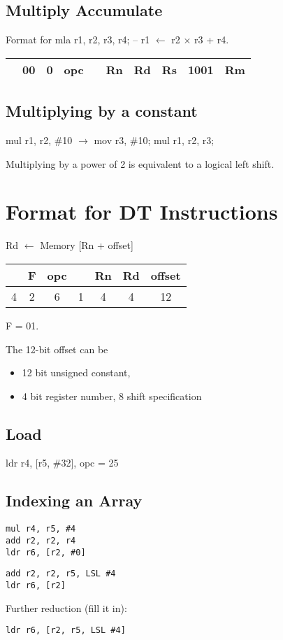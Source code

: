 \documentclass{scrartcl}
\begin{document}
\subsection{Multiply Accumulate}
Format for mla r1, r2, r3, r4; -- r1 $\leftarrow$ r2 $\times$ r3 + r4.

\begin{tabular}{|c|c|c|c|c|c|c|c|c|c|}
	\hline
	& 00 & 0 & opc & & Rn & Rd & Rs & 1001 & Rm\\
	\hline
\end{tabular}

\subsection{Multiplying by a constant}
mul r1, r2, \#10 $\to$ mov r3, \#10; mul r1, r2, r3;

Multiplying by a power of 2 is equivalent to a logical left shift.

\section{Format for DT Instructions}
Rd $\leftarrow$ Memory [Rn + offset]

\begin{tabular}{|c|c|c|c|c|c|c|}
	\hline
	& F & opc & & Rn & Rd & offset\\
	\hline
	4 & 2 & 6 & 1 & 4 & 4 & 12\\
	\hline
\end{tabular}

F = 01.

The 12-bit offset can be
\begin{itemize}
	\item 12 bit unsigned constant,
	\item 4 bit register number, 8 shift specification
\end{itemize}
\subsection{Load}
ldr r4, [r5, \#32], opc = 25

\subsection{Indexing an Array}
\begin{verbatim}
mul r4, r5, #4
add r2, r2, r4
ldr r6, [r2, #0]
\end{verbatim}
\begin{verbatim}
add r2, r2, r5, LSL #4
ldr r6, [r2]
\end{verbatim}
Further reduction (fill it in):
\begin{verbatim}
ldr r6, [r2, r5, LSL #4]
\end{verbatim}
\end{document}
